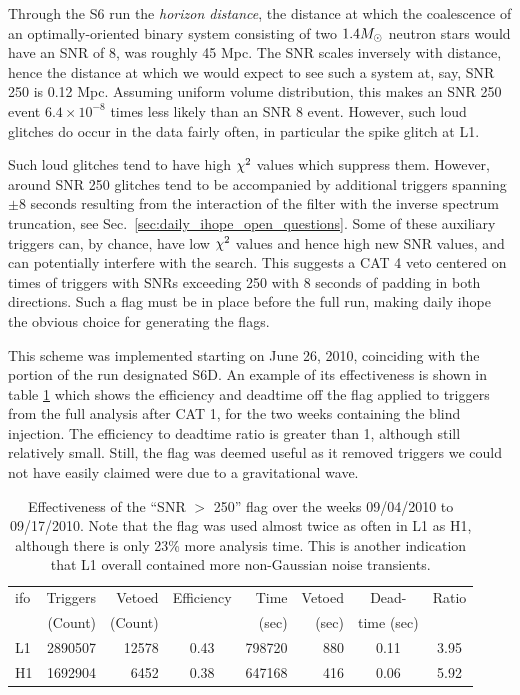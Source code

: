 
Through the S6 run the \emph{horizon distance}, the distance at which
the coalescence of an optimally-oriented binary system consisting of
two $1.4 M_\odot$ neutron stars would have an SNR of 8, was roughly 45
Mpc.  The SNR scales inversely with distance, hence the distance at
which we would expect to see such a system at, say, SNR 250 is 0.12
Mpc.  Assuming uniform volume distribution, this makes an SNR 250
event $6.4 \times 10^{-8}$ times less likely than an SNR 8 event.  
However, such loud glitches do occur in the data fairly often,
in particular the spike glitch at L1.

Such loud glitches tend to have high $\chi^2$ values which suppress
them.  However, around SNR 250 glitches tend to be accompanied by
additional triggers spanning $\pm 8$ seconds resulting from the
interaction of the filter with the inverse spectrum truncation, see
Sec.~\ref{sec:daily_ihope_open_questions}.  Some of these auxiliary
triggers can, by chance, have low $\chi^2$ values and hence high new
SNR values, and can potentially interfere with the search.  This
suggests a CAT 4 veto centered on times of triggers with SNRs
exceeding 250 with 8 seconds of padding in both directions.  Such a
flag must be in place before the full run, making daily ihope the
obvious choice for generating the flags.

This scheme was implemented starting on June 26, 2010, coinciding with
the portion of the run designated S6D.  An example of its
effectiveness is shown in table \ref{tab:daily_ihope_loud_flag} which
shows the efficiency and deadtime off the flag applied to triggers
from the full analysis after CAT 1, for the two weeks containing the
blind injection.  The efficiency to deadtime ratio is greater than 1,
although still relatively small.  Still, the flag was deemed useful as
it removed triggers we could not have easily claimed were due to a
gravitational wave.

\begin{table}
\begin{center}
\begin{tabular}{lrrcrrcc}
\hline
ifo & Triggers & Vetoed & Efficiency & Time
& Vetoed & Dead-  & Ratio \\
 & (Count) & (Count) &  & (sec) & (sec) & time (sec) &  \\
\hline
L1  & 2890507 & 12578 & 0.43 & 798720 & 880 & 0.11 & 3.95 \\
H1  & 1692904 &  6452 & 0.38 & 647168 & 416 & 0.06 & 5.92 \\
\end{tabular}
  \caption[Effectiveness of the ``SNR $>$ 250'' flag]{
  \label{tab:daily_ihope_loud_flag}
Effectiveness of the ``SNR $>$ 250'' flag over the weeks
09/04/2010  to 09/17/2010.  Note that the flag was used almost twice
as often in L1 as H1, although there is only 23\% more analysis time.
This is another indication that L1 overall contained more non-Gaussian
noise transients.}
\end{center}
\end{table}



